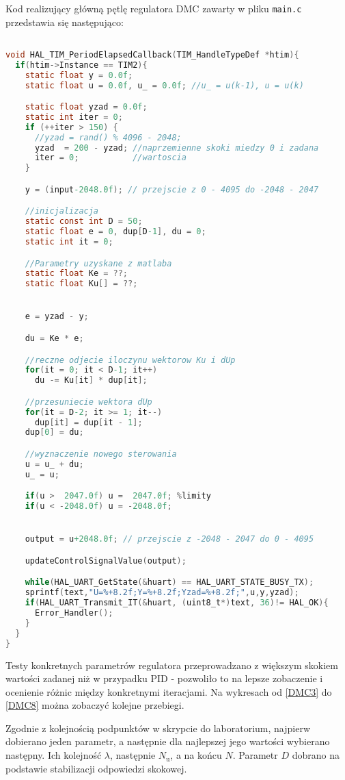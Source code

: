 Kod realizujący główną pętlę regulatora DMC zawarty w pliku \verb|main.c| przedstawia się następująco:

\begin{lstlisting}[language=C]

void HAL_TIM_PeriodElapsedCallback(TIM_HandleTypeDef *htim){
  if(htim->Instance == TIM2){
    static float y = 0.0f;
    static float u = 0.0f, u_ = 0.0f; //u_ = u(k-1), u = u(k)

    static float yzad = 0.0f;
    static int iter = 0;
    if (++iter > 150) {
      //yzad = rand() % 4096 - 2048;
      yzad  = 200 - yzad; //naprzemienne skoki miedzy 0 i zadana
      iter = 0;           //wartoscia
    }

    y = (input-2048.0f); // przejscie z 0 - 4095 do -2048 - 2047

	//inicjalizacja
    static const int D = 50;
    static float e = 0, dup[D-1], du = 0;
    static int it = 0;

    //Parametry uzyskane z matlaba
    static float Ke = ??;
    static float Ku[] = ??;


    e = yzad - y;

    du = Ke * e;

    //reczne odjecie iloczynu wektorow Ku i dUp
    for(it = 0; it < D-1; it++)
      du -= Ku[it] * dup[it];

	//przesuniecie wektora dUp
    for(it = D-2; it >= 1; it--)
      dup[it] = dup[it - 1];
    dup[0] = du;

	//wyznaczenie nowego sterowania
    u = u_ + du;
    u_ = u;

    if(u >  2047.0f) u =  2047.0f; %limity
    if(u < -2048.0f) u = -2048.0f;


    output = u+2048.0f; // przejscie z -2048 - 2047 do 0 - 4095

    updateControlSignalValue(output);

    while(HAL_UART_GetState(&huart) == HAL_UART_STATE_BUSY_TX);
    sprintf(text,"U=%+8.2f;Y=%+8.2f;Yzad=%+8.2f;",u,y,yzad);
    if(HAL_UART_Transmit_IT(&huart, (uint8_t*)text, 36)!= HAL_OK){
      Error_Handler();
    }
  }
}
\end{lstlisting}

Testy konkretnych parametrów regulatora przeprowadzano z większym skokiem wartości zadanej niż w przypadku PID - pozwoliło to na lepsze zobaczenie i ocenienie różnic między konkretnymi iteracjami. Na wykresach od \ref{DMC3} do \ref{DMC8} można zobaczyć kolejne przebiegi.

Zgodnie z kolejnością podpunktów w skrypcie do laboratorium, najpierw dobierano jeden parametr, a następnie dla najlepszej jego wartości wybierano następny. Ich kolejność $ \lambda $, następnie $ N_\mathrm{u} $, a na końcu $ N $. Parametr $ D $ dobrano na podstawie stabilizacji odpowiedzi skokowej.

